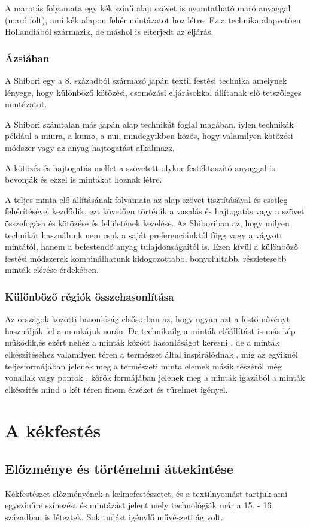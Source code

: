 \documentclass[fontsize=12pt, appendixprefix=true]{scrreprt}
\begin{document}
A maratás folyamata egy kék színű alap szövet is nyomtatható maró anyaggal (maró folt), ami kék alapon fehér mintázatot hoz  létre. Ez a technika alapvetően Hollandiából származik, de máshol is elterjedt az eljárás.

\subsection{Ázsiában}
A Shibori egy a 8. századból származó japán textil festési technika \cite{shibori} amelynek lényege, hogy különböző kötözési, csomózási eljárásokkal állítanak elő tetszőleges mintázatot.

A Shibori számtalan más japán alap technikát foglal magában, iylen technikák például a miura, a kumo, a nui, mindegyikben közös, hogy valamilyen kötözési módszer vagy az anyag hajtogatást alkalmazz. 

A kötözés és hajtogatás mellet a szövetett olykor festéktaszító anyaggal is bevonják és ezzel is mintákat hoznak létre.

A teljes minta elő állításának folyamata az alap szövet tisztításával és esetleg fehérítésével kezdődik, ezt követően történik a vasalás és hajtogatás vagy a szövet összefogása és kötözése és felületének kezelése.
Az Shiboriban az, hogy milyen technikát használunk nem csak a saját preferenciánktól függ vagy a vágyott mintától, hanem a befestendő anyag tulajdonságaitól is. Ezen kívül  a különböző festési módszerek kombinálhatunk kidogozottabb, bonyolultabb, részletesebb minták elérése érdekében. 

\subsection{Különböző régiók összehasonlítása}
   Az országok közötti hasonlóság elsősorban az, hogy ugyan azt a festő nővényt használják fel a munkájuk során.
   De technikailg a minták előállítást is más kép működik,és ezért nehéz a minták kőzött hasonlóságot keresni , de a  minták  elkészítéséhez valamilyen téren a természet által inspirálódnak , míg az egyiknél teljesformájában jelenek meg a természeti minta elemek másik részéről még vonallak vagy pontok , körök formájában jelenek meg a minták  
    igazából a minták elkészítés mind a két téren finom érzéket és türelmet igényel.

\chapter{A kékfestés}
\section{Előzménye és történelmi áttekintése}
Kékfestészet előzményének a kelmefestészetet, és a textilnyomást tartjuk ami egyszínűre színezést és mintázást jelent mely technológiák már a 15. - 16. században is léteztek. Sok tudást igénylő művészeti ág volt.
\end{document}
